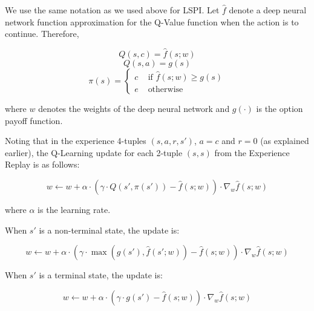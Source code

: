 \documentclass[12pt]{amsart}
\begin{document}
We use the same notation as we used above for LSPI. Let $\hat{f}$ denote a deep neural network function approximation for the Q-Value function when the action is to continue. Therefore,

$$Q(s,c) = \hat{f}(s;w)$$
$$Q(s,a) = g(s)$$
$$
\pi(s) =
\begin{cases}
c & \text{ if } \hat{f}(s;w) \geq g(s) \\
e & \text{ otherwise}
\end{cases}
$$

where $w$ denotes the weights of the deep neural network and $g(\cdot)$ is the option payoff function.

Noting that in the experience 4-tuples $(s,a,r,s')$, $a=c$ and $r=0$ (as explained earlier), the Q-Learning update for each 2-tuple $(s,s)$ from the Experience Replay is as follows:

$$w \leftarrow w + \alpha \cdot (\gamma \cdot Q(s', \pi(s')) - \hat{f}(s;w)) \cdot \nabla_w \hat{f}(s;w)$$

where $\alpha$ is the learning rate.

When $s'$ is a non-terminal state, the update is:

$$w \leftarrow w + \alpha \cdot (\gamma \cdot \max(g(s'), \hat{f}(s';w)) - \hat{f}(s;w)) \cdot \nabla_w \hat{f}(s;w)$$

When $s'$ is a terminal state, the update is:

$$w \leftarrow w + \alpha \cdot (\gamma \cdot g(s') - \hat{f}(s;w)) \cdot \nabla_w \hat{f}(s;w)$$
 
\end{document}
